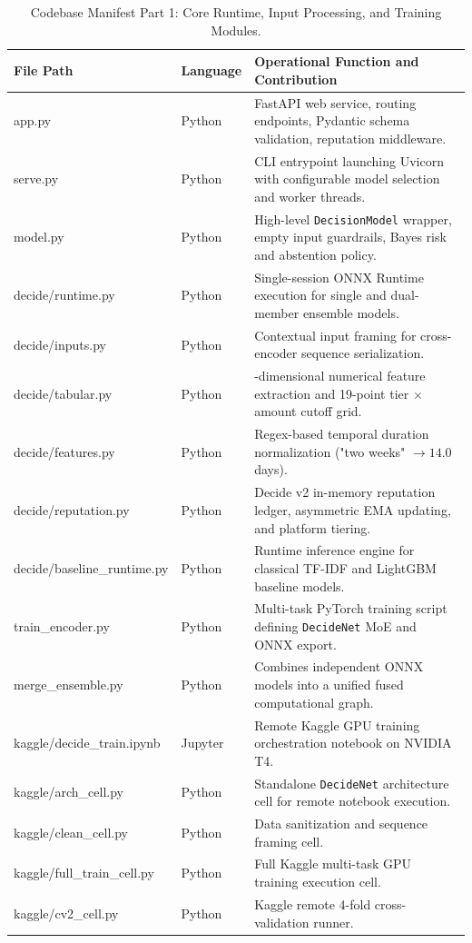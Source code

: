 \documentclass[11pt,a4paper]{article}
\begin{document}
\begin{table}[htbp]
\centering
\small
\renewcommand{\arraystretch}{1.2}
\begin{tabularx}{\linewidth}{>{\raggedright\arraybackslash\ttfamily\small}p{5.1cm} >{\raggedright\arraybackslash}p{1.8cm} >{\raggedright\arraybackslash}X}
\toprule
\textbf{File Path} & \textbf{Language} & \textbf{Operational Function and Contribution} \\
\midrule
app.py & Python & FastAPI web service, routing endpoints, Pydantic schema validation, reputation middleware. \\
serve.py & Python & CLI entrypoint launching Uvicorn with configurable model selection and worker threads. \\
model.py & Python & High-level \texttt{DecisionModel} wrapper, empty input guardrails, Bayes risk and abstention policy. \\
decide/runtime.py & Python & Single-session ONNX Runtime execution for single and dual-member ensemble models. \\
decide/inputs.py & Python & Contextual input framing for cross-encoder sequence serialization. \\
decide/tabular.py & Python & 75-dimensional numerical feature extraction and 19-point tier $\times$ amount cutoff grid. \\
decide/features.py & Python & Regex-based temporal duration normalization ("two weeks" $\to 14.0$ days). \\
decide/reputation.py & Python & Decide v2 in-memory reputation ledger, asymmetric EMA updating, and platform tiering. \\
decide/baseline\_runtime.py & Python & Runtime inference engine for classical TF-IDF and LightGBM baseline models. \\
train\_encoder.py & Python & Multi-task PyTorch training script defining \texttt{DecideNet} MoE and ONNX export. \\
merge\_ensemble.py & Python & Combines independent ONNX models into a unified fused computational graph. \\
kaggle/decide\_train.ipynb & Jupyter & Remote Kaggle GPU training orchestration notebook on NVIDIA T4. \\
kaggle/arch\_cell.py & Python & Standalone \texttt{DecideNet} architecture cell for remote notebook execution. \\
kaggle/clean\_cell.py & Python & Data sanitization and sequence framing cell. \\
kaggle/full\_train\_cell.py & Python & Full Kaggle multi-task GPU training execution cell. \\
kaggle/cv2\_cell.py & Python & Kaggle remote 4-fold cross-validation runner. \\
\bottomrule
\end{tabularx}
\caption{Codebase Manifest Part 1: Core Runtime, Input Processing, and Training Modules.}
\label{tab:file_manifest_part1}
\end{table}
\end{document}
